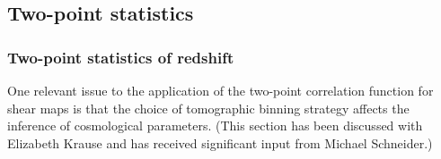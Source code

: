 \documentclass[12pt, onecolumn]{emulateapj}
\begin{document}
%
%

\subsection{Two-point statistics}
\subsubsection{Two-point statistics of redshift}

One relevant issue to the application of the two-point correlation function for shear maps is that the choice of tomographic binning strategy affects the inference of cosmological parameters.  (This section has been discussed with Elizabeth Krause and has received significant input from Michael Schneider.)
\end{document}
